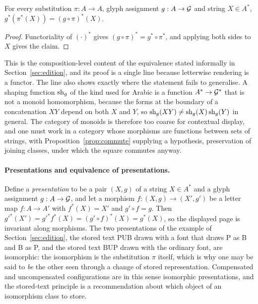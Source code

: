 \begin{proposition}\label{prop:letterwise}
For every substitution $\pi:A\to A$, glyph assignment $g:A\to\mathcal{G}$ and string $X\in A^{*}$, $g^{*}(\pi^{*}(X))=(g\circ\pi)^{*}(X)$.
\end{proposition}

\begin{proof}
Functoriality of $(\cdot)^{*}$ gives $(g\circ\pi)^{*}=g^{*}\circ\pi^{*}$, and applying both sides to $X$ gives the claim.
\end{proof}

This is the composition-level content of the equivalence stated informally in Section~\ref{sec:edition}, and its proof is a single line because letterwise rendering is a functor. The line also shows exactly where the statement fails to generalise. A shaping function $\mathrm{sh}_g$ of the kind used for Arabic is a function $A^{*}\to\mathcal{G}^{*}$ that is not a monoid homomorphism, because the forms at the boundary of a concatenation $XY$ depend on both $X$ and $Y$, so $\mathrm{sh}_g(XY)\ne\mathrm{sh}_g(X)\,\mathrm{sh}_g(Y)$ in general. The category of monoids is therefore too coarse for contextual display, and one must work in a category whose morphisms are functions between sets of strings, with Proposition~\ref{prop:commute} supplying a hypothesis, preservation of joining classes, under which the square commutes anyway.

\paragraph{Presentations and equivalence of presentations.}
Define a \emph{presentation} to be a pair $(X,g)$ of a string $X\in A^{*}$ and a glyph assignment $g:A\to\mathcal{G}$, and let a morphism $f:(X,g)\to(X',g')$ be a letter map $f:A\to A'$ with $f^{*}(X)=X'$ and $g'\circ f=g$. Then $g'^{*}(X')=g'^{*}f^{*}(X)=(g'\circ f)^{*}(X)=g^{*}(X)$, so the displayed page is invariant along morphisms. The two presentations of the example of Section~\ref{sec:edition}, the stored text PUB drawn with a font that draws P as B and B as P, and the stored text BUP drawn with the ordinary font, are isomorphic: the isomorphism is the substitution $\pi$ itself, which is why one may be said to \emph{be} the other seen through a change of stored representation. Compensated and uncompensated configurations are in this sense isomorphic presentations, and the stored-text principle is a recommendation about which object of an isomorphism class to store.

